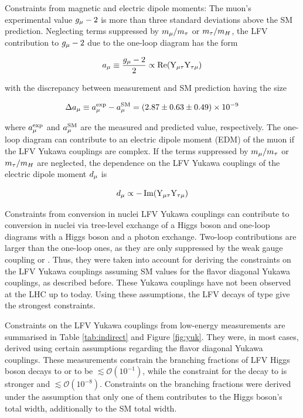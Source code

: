 Constraints from magnetic and electric dipole moments: The muon's experimental value $g_{\mu}-2$ is more than three standard deviations above the SM prediction. Neglecting terms suppressed by $m_{\mu} / m_{\tau}$ or $m_{\tau} / m_{H}$, the LFV contribution to $g_{\mu}-2$ due to the one-loop diagram has the form

\begin{equation}
  a_{\mu} \equiv \frac{g_{\mu}-2}{2} \propto \operatorname{Re}(\text{Y}_{\mu\tau} \text{Y}_{\tau\mu})
\end{equation}

with the discrepancy between measurement and SM prediction having the size

\begin{equation}
  \Delta a_{\mu} \equiv a_{\mu}^{\mathrm{exp}}-a_{\mu}^{\mathrm{SM}}=(2.87 \pm 0.63 \pm 0.49) \times 10^{-9}
\end{equation}

where $a_{\mu}^{\mathrm{exp}}$ and $a_{\mu}^{\mathrm{SM}}$ are the measured and predicted value, respectively. The one-loop diagram can contribute to an electric dipole moment (EDM) of the muon if the LFV Yukawa couplings are complex. If the terms suppressed by $m_{\mu} / m_{\tau}$ or $m_{\tau} / m_{H}$ are neglected, the dependence on the LFV Yukawa couplings of the electric dipole moment $d_{\mu}$ is

\begin{equation}
  d_{\mu} \propto-\operatorname{Im}(\text{Y}_{\mu\tau} \text{Y}_{\tau\mu})
\end{equation}

Constraints from \mte conversion in nuclei LFV Yukawa couplings can contribute to \mte conversion in nuclei via tree-level exchange of a Higgs boson and one-loop diagrams with a Higgs boson and a photon exchange. Two-loop contributions are larger than the one-loop ones, as they are only suppressed by the weak gauge coupling or \Ytt. Thus, they were taken into account for deriving the constraints on the LFV Yukawa couplings assuming SM values for the flavor diagonal Yukawa couplings, as described before. These Yukawa couplings have not been observed at the LHC up to today. Using these assumptions, the LFV decays of type \liljg give the strongest constraints.

Constraints on the LFV Yukawa couplings from low-energy measurements are summarised in Table \ref{tab:indirect} and Figure \ref{fig:yuk}. They were, in most cases, derived using certain assumptions regarding the flavor diagonal Yukawa couplings. These measurements constrain the branching fractions of LFV Higgs boson decays to \mutau or \etau to be $\lesssim \mathcal{O}(10^{-1})$, while the constraint for the decay to \emm is stronger and $\lesssim \mathcal{O}(10^{-8})$. Constraints on the branching fractions were derived under the assumption that only one of them contributes to the Higgs boson's total width, additionally to the SM total width.

